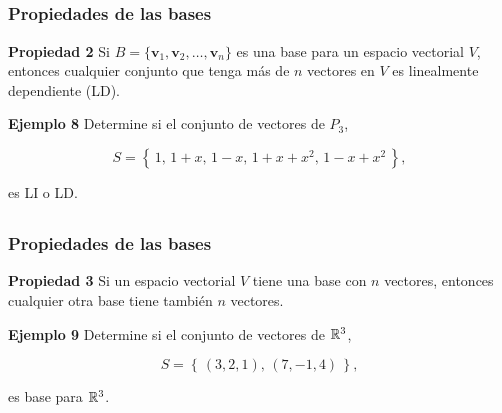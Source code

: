 
\subsection{}

\begin{frame}\frametitle{Propiedades de las bases}
	
	\begin{prop}{\textbf{Propiedad 2}}\justifying
		Si $B=\{\mathbf{v}_1, \mathbf{v}_2, \hdots , \mathbf{v}_n \}$ es una base para un espacio vectorial $V$, entonces
		cualquier conjunto que tenga más de $n$ vectores en $V$ es linealmente dependiente (LD).
	\end{prop}	
	
	\vspace{0mm} 
	
	\begin{ej}{\textbf{Ejemplo 8}} \justifying
		Determine si el conjunto de vectores de $P_3$,
		
		\vspace{-2mm}
		\[
		S = \left\{ \, 1,\, 1+x,\, 1-x,\, 1+x+x^2,\, 1-x+x^2 \, \right\},
		\]
		
		\vspace{-2mm}
		es LI o LD.
	\end{ej}	
	
\end{frame}



\subsection{}

\begin{frame}\frametitle{Propiedades de las bases}

\begin{prop}{\textbf{Propiedad 3}}\justifying
	Si un espacio vectorial $V$ tiene una base con $n$ vectores, entonces cualquier otra base tiene también $n$ vectores.
\end{prop}	

\begin{ej}{\textbf{Ejemplo 9}} \justifying
	Determine si el conjunto de vectores de $\mathbb{R}^3$,
	
	\vspace{-2mm}
	\[
	S = \left\{ \, (3,2,1),\, (7,-1,4) \,\right\},
	\]
	
	\vspace{-2mm}
	es base para $\mathbb{R}^3$.
\end{ej}	

\end{frame}

